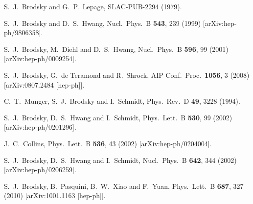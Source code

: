 \documentclass[prd,aps,onecolumn,nofootinbib]{revtex4}
\begin{document}
\begin{thebibliography}{99}
  S.~J.~Brodsky and G.~P.~Lepage,
  SLAC-PUB-2294 (1979).

  S.~J.~Brodsky and D.~S.~Hwang,
  Nucl.\ Phys.\  B {\bf 543}, 239 (1999)
  [arXiv:hep-ph/9806358].

  S.~J.~Brodsky, M.~Diehl and D.~S.~Hwang,
  Nucl.\ Phys.\  B {\bf 596}, 99 (2001)
  [arXiv:hep-ph/0009254].

  S.~J.~Brodsky, G.~de Teramond and R.~Shrock,
  AIP Conf.\ Proc.\  {\bf 1056}, 3 (2008)
  [arXiv:0807.2484 [hep-ph]].

  C.~T.~Munger, S.~J.~Brodsky and I.~Schmidt,
  Phys.\ Rev.\  D {\bf 49}, 3228 (1994).

  S.~J.~Brodsky, D.~S.~Hwang and I.~Schmidt,
  Phys.\ Lett.\  B {\bf 530}, 99 (2002)
  [arXiv:hep-ph/0201296].

  J.~C.~Collins,
  Phys.\ Lett.\  B {\bf 536}, 43 (2002)
  [arXiv:hep-ph/0204004].

  S.~J.~Brodsky, D.~S.~Hwang and I.~Schmidt,
  Nucl.\ Phys.\  B {\bf 642}, 344 (2002)
  [arXiv:hep-ph/0206259].

  S.~J.~Brodsky, B.~Pasquini, B.~W.~Xiao and F.~Yuan,
  Phys.\ Lett.\  B {\bf 687}, 327 (2010)
  [arXiv:1001.1163 [hep-ph]].


\end{thebibliography}
\end{document}
